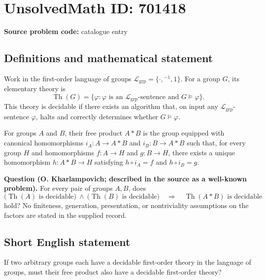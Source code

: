 \documentclass[11pt]{article}
\begin{document}
\section*{UnsolvedMath ID: 701418}
\textbf{Source problem code:} catalogue entry
\subsection{Definitions and mathematical statement}
Work in the first-order language of groups \(\mathcal L_{\mathrm{grp}}=\{\cdot,{}^{-1},1\}\). For a group \(G\), its elementary theory is
\[
\operatorname{Th}(G)=\{\varphi:\varphi\text{ is an }\mathcal L_{\mathrm{grp}}\text{-sentence and }G\models\varphi\}.
\]
This theory is decidable if there exists an algorithm that, on input any \(\mathcal L_{\mathrm{grp}}\)-sentence \(\varphi\), halts and correctly determines whether \(G\models\varphi\).

For groups \(A\) and \(B\), their free product \(A*B\) is the group equipped with canonical homomorphisms \(i_A:A\to A*B\) and \(i_B:B\to A*B\) such that, for every group \(H\) and homomorphisms \(f:A\to H\) and \(g:B\to H\), there exists a unique homomorphism \(h:A*B\to H\) satisfying \(h\circ i_A=f\) and \(h\circ i_B=g\).

\textbf{Question (O. Kharlampovich; described in the source as a well-known problem).} For every pair of groups \(A,B\), does
\[
\bigl(\operatorname{Th}(A)\text{ is decidable}\bigr)\ \land\ \bigl(\operatorname{Th}(B)\text{ is decidable}\bigr)
\quad\Longrightarrow\quad
\operatorname{Th}(A*B)\text{ is decidable}
\]
hold? No finiteness, generation, presentation, or nontriviality assumptions on the factors are stated in the supplied record.
\subsection{Short English statement}
If two arbitrary groups each have a decidable first-order theory in the language of groups, must their free product also have a decidable first-order theory?
\end{document}
